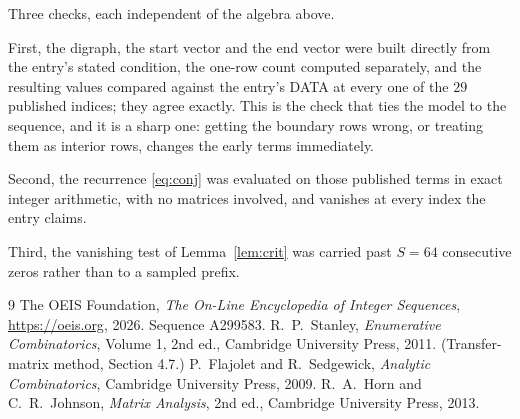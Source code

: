 \documentclass[11pt,a4paper]{article}
\theoremstyle{plain}
\theoremstyle{definition}
\begin{document}
Three checks, each independent of the algebra above.

First, the digraph, the start vector and the end vector were built directly from the
entry's stated condition, the one-row count computed separately, and the resulting values
compared against the entry's DATA at every one of the $29$ published indices; they
agree exactly. This is the check that ties the model to the sequence, and it is a sharp one:
getting the boundary rows wrong, or treating them as interior rows, changes the early terms
immediately.

Second, the recurrence \eqref{eq:conj} was evaluated on those published terms in exact
integer arithmetic, with no matrices involved, and vanishes at every index the entry claims.

Third, the vanishing test of Lemma~\ref{lem:crit} was carried past $S=64$ consecutive
zeros rather than to a sampled prefix.

\begin{thebibliography}{9}
 The OEIS Foundation, \emph{The On-Line Encyclopedia of Integer
Sequences}, \url{https://oeis.org}, 2026. Sequence A299583.
 R.~P.~Stanley, \emph{Enumerative Combinatorics}, Volume 1, 2nd ed.,
Cambridge University Press, 2011. (Transfer-matrix method, Section 4.7.)
 P.~Flajolet and R.~Sedgewick, \emph{Analytic Combinatorics}, Cambridge
University Press, 2009.
 R.~A.~Horn and C.~R.~Johnson, \emph{Matrix Analysis}, 2nd ed., Cambridge
University Press, 2013.
\end{thebibliography}
\end{document}
